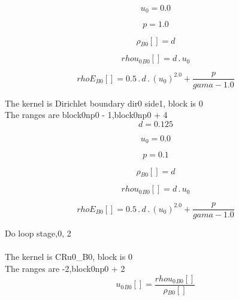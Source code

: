 \documentclass{article}
\begin{document}
\begin{dmath}u_{0} = 0.0\end{dmath}

\begin{dmath}p = 1.0\end{dmath}

\begin{dmath}{\rho{_{B0}}}[{}] = d\end{dmath}

\begin{dmath}{rhou_{0}{_{B0}}}[{}] = d \,.\, u_{0}\end{dmath}

\begin{dmath}{rhoE{_{B0}}}[{}] = 0.5 \,.\, d \,.\, \left(u_{0} \right)^{2.0} + \frac{p}{gama - 1.0}\end{dmath}

\noindent The kernel is Dirichlet boundary dir0 side1, block is 0\\\noindent The ranges are block0np0 - 1,block0np0 + 4\\\begin{dmath}d = 0.125\end{dmath}

\begin{dmath}u_{0} = 0.0\end{dmath}

\begin{dmath}p = 0.1\end{dmath}

\begin{dmath}{\rho{_{B0}}}[{}] = d\end{dmath}

\begin{dmath}{rhou_{0}{_{B0}}}[{}] = d \,.\, u_{0}\end{dmath}

\begin{dmath}{rhoE{_{B0}}}[{}] = 0.5 \,.\, d \,.\, \left(u_{0} \right)^{2.0} + \frac{p}{gama - 1.0}\end{dmath}

\noindent Do loop stage,0, 2\\
\\\noindent The kernel is CRu0_B0, block is 0\\\noindent The ranges are -2,block0np0 + 2\\\begin{dmath}{u_{0}{_{B0}}}[{}] = \frac{{rhou_{0}{_{B0}}}[{}]}{{\rho{_{B0}}}[{}]}\end{dmath}
\end{document}
